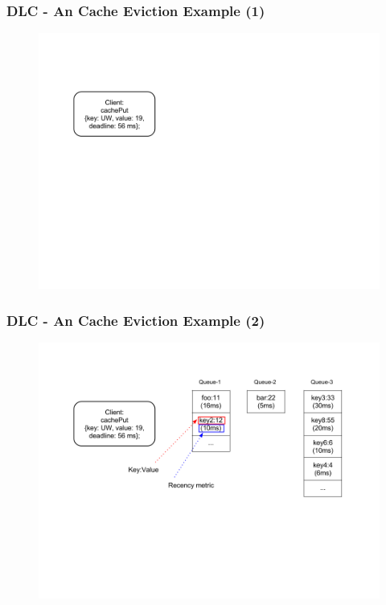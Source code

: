 \documentclass{beamer}
\begin{document}
\begin{frame}
  \frametitle{DLC - An Cache Eviction Example (1)}
  \begin{figure}
    \begin{center}
      \centerline{\includegraphics[scale=0.33]{img/DLC_NEW_1.png}}
    \end{center}
  \end{figure}
\end{frame}


\begin{frame}
  \frametitle{DLC - An Cache Eviction Example (2)}
  \begin{figure}
    \begin{center}
      \centerline{\includegraphics[scale=0.33]{img/DLC_NEW_2.png}}
    \end{center}
  \end{figure}
\end{frame}
\end{document}
